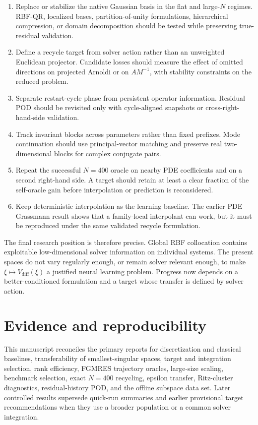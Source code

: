 \documentclass[11pt]{article}
\begin{document}
\begin{enumerate}[label=\arabic*.]
  \item Replace or stabilize the native Gaussian basis in the flat and large-$N$ regimes. RBF-QR, localized bases, partition-of-unity formulations, hierarchical compression, or domain decomposition should be tested while preserving true-residual validation.
  \item Define a recycle target from solver action rather than an unweighted Euclidean projector. Candidate losses should measure the effect of omitted directions on projected Arnoldi or on $AM^{-1}$, with stability constraints on the reduced problem.
  \item Separate restart-cycle phase from persistent operator information. Residual POD should be revisited only with cycle-aligned snapshots or cross-right-hand-side validation.
  \item Track invariant blocks across parameters rather than fixed prefixes. Mode continuation should use principal-vector matching and preserve real two-dimensional blocks for complex conjugate pairs.
  \item Repeat the successful $N=400$ oracle on nearby PDE coefficients and on a second right-hand side. A target should retain at least a clear fraction of the self-oracle gain before interpolation or prediction is reconsidered.
  \item Keep deterministic interpolation as the learning baseline. The earlier PDE Grassmann result shows that a family-local interpolant can work, but it must be reproduced under the same validated recycle formulation.
\end{enumerate}

The final research position is therefore precise. Global RBF collocation contains exploitable low-dimensional solver information on individual systems. The present spaces do not vary regularly enough, or remain solver relevant enough, to make $\xi\mapsto V_{\mathrm{diff}}(\xi)$ a justified neural learning problem. Progress now depends on a better-conditioned formulation and a target whose transfer is defined by solver action.

\section*{Evidence and reproducibility}

This manuscript reconciles the primary reports for discretization and classical baselines, transferability of smallest-singular spaces, target and integration selection, rank efficiency, FGMRES trajectory oracles, large-size scaling, benchmark selection, exact $N=400$ recycling, epsilon transfer, Ritz-cluster diagnostics, residual-history POD, and the offline subspace data set. Later controlled results supersede quick-run summaries and earlier provisional target recommendations when they use a broader population or a common solver integration.
\end{document}
